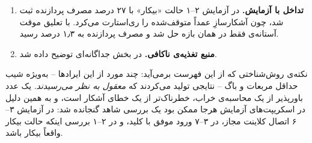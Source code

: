\begin{enumerate}
	\item \textbf{تداخل  با آزمایش.} در آزمایش ۲--۱ حالت «بیکار» با ۲۷ درصد مصرف پردازنده ثبت شد، چون  آشکارسازِ عمداً متوقف‌شده را ری‌استارت می‌کرد. با تعلیق موقت آستانه‌ی  فقط در همان بازه حل شد و مصرف پردازنده به ۱٫۳ درصد رسید.

	\item \textbf{منبع تغذیه‌ی ناکافی.} در بخش جداگانه‌ای توضیح داده شد.
\end{enumerate}

نکته‌ی روش‌شناختی که از این فهرست برمی‌آید: چند مورد از این ایرادها -- به‌ویژه شیب حداقل مربعات و باگ  -- نتایجی تولید می‌کردند که \emph{معقول به نظر می‌رسیدند}. یک عدد باورپذیر از یک محاسبه‌ی خراب، خطرناک‌تر از یک خطای آشکار است، و به همین دلیل در اسکریپت‌های آزمایش هرجا ممکن بود یک بررسی شاهد گنجانده شد: در آزمایش ۳--۶ اتصال کلاینت مجاز، در ۳--۷ ورود موفق با کلید، و در ۲--۱ بررسی اینکه حالت بیکار واقعاً بیکار باشد.
